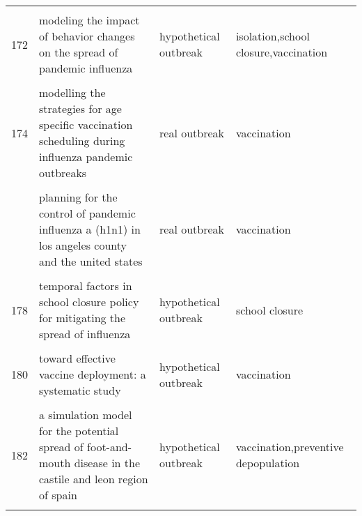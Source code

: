 \documentclass[
]{article}
\begin{document}
\begin{landscape}
\begin{longtable}{l>{\raggedright\arraybackslash}p{3cm}l>{\raggedright\arraybackslash}p{8cm}}
\addlinespace
\cellcolor{gray!6}{171} & \cellcolor{gray!6}{modeling control strategies for concurrent epidemics of seasonal and pandemic h1n1 influenza} & \cellcolor{gray!6}{hypothetical outbreak} & \cellcolor{gray!6}{distancing,treatment}\\
172 & modeling the impact of behavior changes on the spread of pandemic influenza & hypothetical outbreak & isolation,school closure,vaccination\\
\cellcolor{gray!6}{173} & \cellcolor{gray!6}{modelling and analysis of influenza a (h1n1) on networks} & \cellcolor{gray!6}{real outbreak} & \cellcolor{gray!6}{vaccination}\\
174 & modelling the strategies for age specific vaccination scheduling during influenza pandemic outbreaks & real outbreak & vaccination\\
\cellcolor{gray!6}{175} & \cellcolor{gray!6}{modelling the transmission dynamics and control of the novel 2009 swine influenza (h1n1) pandemic} & \cellcolor{gray!6}{real outbreak} & \cellcolor{gray!6}{vaccination}\\
\addlinespace
176 & planning for the control of pandemic influenza a (h1n1) in los angeles county and the united states & real outbreak & vaccination\\
\cellcolor{gray!6}{177} & \cellcolor{gray!6}{prioritization of delayed vaccination for pandemic influenza} & \cellcolor{gray!6}{real outbreak} & \cellcolor{gray!6}{vaccination}\\
178 & temporal factors in school closure policy for mitigating the spread of influenza & hypothetical outbreak & school closure\\
\cellcolor{gray!6}{179} & \cellcolor{gray!6}{the global transmission and control of influenza} & \cellcolor{gray!6}{hypothetical outbreak} & \cellcolor{gray!6}{vaccination}\\
180 & toward effective vaccine deployment: a systematic study & hypothetical outbreak & vaccination\\
\addlinespace
\cellcolor{gray!6}{181} & \cellcolor{gray!6}{vaccination against 2009 pandemic h1n1 in a population dynamical model of vancouver, canada: timing is everything} & \cellcolor{gray!6}{real outbreak} & \cellcolor{gray!6}{vaccination}\\
182 & a simulation model for the potential spread of foot-and-mouth disease in the castile and leon region of spain & hypothetical outbreak & vaccination,preventive depopulation\\
\cellcolor{gray!6}{183} & \cellcolor{gray!6}{community-based measures for mitigating the 2009 h1n1 pandemic in china} & \cellcolor{gray!6}{real outbreak} & \cellcolor{gray!6}{quarantine,school closure,hygiene precaution}\\

\end{longtable}
\end{landscape}
\end{document}
